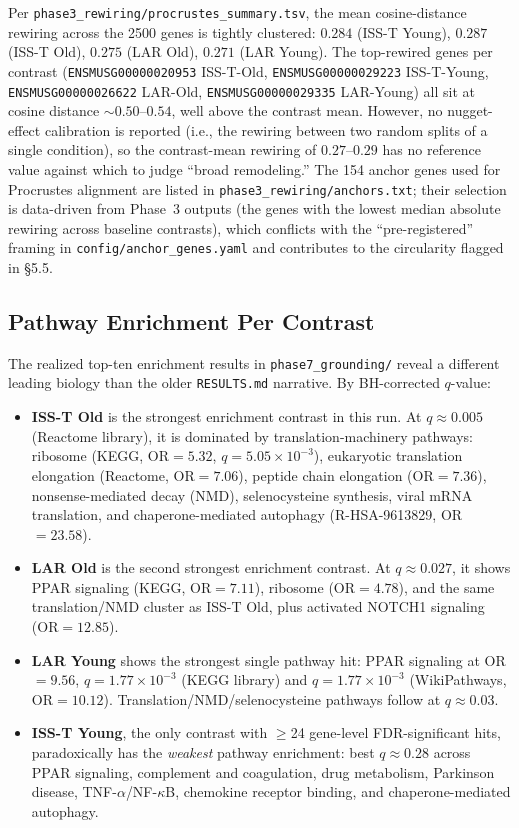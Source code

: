 \documentclass[11pt]{article}
\newcommand{\code}[1]{\texttt{#1}}
\begin{document}
Per \code{phase3\_rewiring/procrustes\_summary.tsv}, the mean cosine-distance rewiring across the 2500 genes is tightly clustered: $0.284$ (ISS-T Young), $0.287$ (ISS-T Old), $0.275$ (LAR Old), $0.271$ (LAR Young). The top-rewired genes per contrast (\code{ENSMUSG00000020953} ISS-T-Old, \code{ENSMUSG00000029223} ISS-T-Young, \code{ENSMUSG00000026622} LAR-Old, \code{ENSMUSG00000029335} LAR-Young) all sit at cosine distance $\sim 0.50\text{--}0.54$, well above the contrast mean. However, no nugget-effect calibration is reported (i.e., the rewiring between two random splits of a single condition), so the contrast-mean rewiring of $0.27$--$0.29$ has no reference value against which to judge ``broad remodeling.'' The 154 anchor genes used for Procrustes alignment are listed in \code{phase3\_rewiring/anchors.txt}; their selection is data-driven from Phase~3 outputs (the genes with the lowest median absolute rewiring across baseline contrasts), which conflicts with the ``pre-registered'' framing in \code{config/anchor\_genes.yaml} and contributes to the circularity flagged in \S 5.5.

\subsection{Pathway Enrichment Per Contrast}

The realized top-ten enrichment results in \code{phase7\_grounding/} reveal a different leading biology than the older \code{RESULTS.md} narrative. By BH-corrected $q$-value:

\begin{itemize}[leftmargin=*]
\item \textbf{ISS-T Old} is the strongest enrichment contrast in this run. At $q\approx 0.005$ (Reactome library), it is dominated by translation-machinery pathways: ribosome (KEGG, OR$=5.32$, $q=5.05\times 10^{-3}$), eukaryotic translation elongation (Reactome, OR$=7.06$), peptide chain elongation (OR$=7.36$), nonsense-mediated decay (NMD), selenocysteine synthesis, viral mRNA translation, and chaperone-mediated autophagy (R-HSA-9613829, OR$=23.58$).
\item \textbf{LAR Old} is the second strongest enrichment contrast. At $q\approx 0.027$, it shows PPAR signaling (KEGG, OR$=7.11$), ribosome (OR$=4.78$), and the same translation/NMD cluster as ISS-T Old, plus activated NOTCH1 signaling (OR$=12.85$).
\item \textbf{LAR Young} shows the strongest single pathway hit: PPAR signaling at OR$=9.56$, $q=1.77\times 10^{-3}$ (KEGG library) and $q=1.77\times 10^{-3}$ (WikiPathways, OR$=10.12$). Translation/NMD/selenocysteine pathways follow at $q\approx 0.03$.
\item \textbf{ISS-T Young}, the only contrast with $\geq$24 gene-level FDR-significant hits, paradoxically has the \emph{weakest} pathway enrichment: best $q\approx 0.28$ across PPAR signaling, complement and coagulation, drug metabolism, Parkinson disease, TNF-$\alpha$/NF-$\kappa$B, chemokine receptor binding, and chaperone-mediated autophagy.
\end{itemize}
\end{document}
